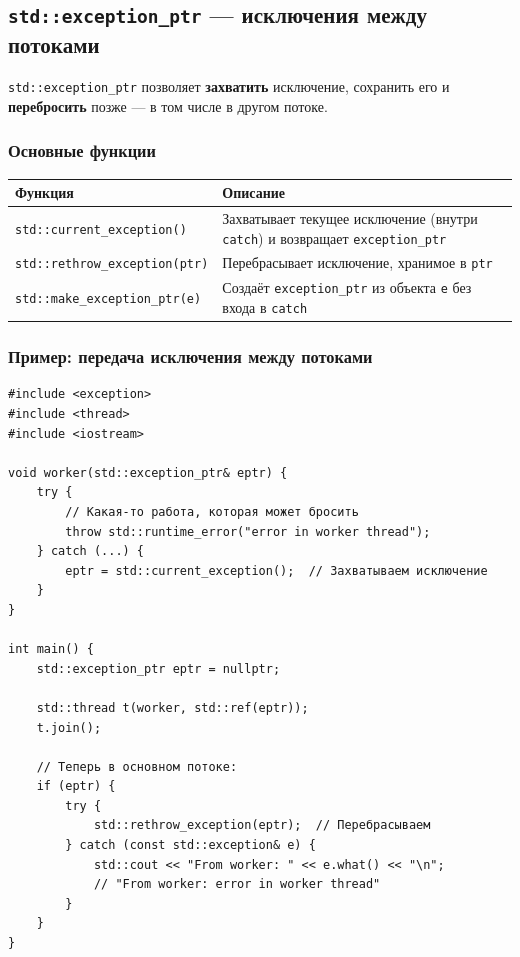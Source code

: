 \documentclass[a4paper,12pt]{article}
\begin{document}
\subsection{\texttt{std::exception\_ptr} --- исключения между потоками}

\texttt{std::exception\_ptr} позволяет \textbf{захватить} исключение,
сохранить его и \textbf{перебросить} позже --- в том числе в другом потоке.

\subsubsection{Основные функции}

\begin{center}
\begin{tabular}{lp{8cm}}
\toprule
\textbf{Функция} & \textbf{Описание} \\
\midrule
\texttt{std::current\_exception()}
    & Захватывает текущее исключение (внутри \texttt{catch}) и возвращает
      \texttt{exception\_ptr} \\
\addlinespace
\texttt{std::rethrow\_exception(ptr)}
    & Перебрасывает исключение, хранимое в \texttt{ptr} \\
\addlinespace
\texttt{std::make\_exception\_ptr(e)}
    & Создаёт \texttt{exception\_ptr} из объекта \texttt{e} без
      входа в \texttt{catch} \\
\bottomrule
\end{tabular}
\end{center}

\subsubsection{Пример: передача исключения между потоками}

\begin{lstlisting}
#include <exception>
#include <thread>
#include <iostream>

void worker(std::exception_ptr& eptr) {
    try {
        // Какая-то работа, которая может бросить
        throw std::runtime_error("error in worker thread");
    } catch (...) {
        eptr = std::current_exception();  // Захватываем исключение
    }
}

int main() {
    std::exception_ptr eptr = nullptr;

    std::thread t(worker, std::ref(eptr));
    t.join();

    // Теперь в основном потоке:
    if (eptr) {
        try {
            std::rethrow_exception(eptr);  // Перебрасываем
        } catch (const std::exception& e) {
            std::cout << "From worker: " << e.what() << "\n";
            // "From worker: error in worker thread"
        }
    }
}
\end{lstlisting}
\end{document}
